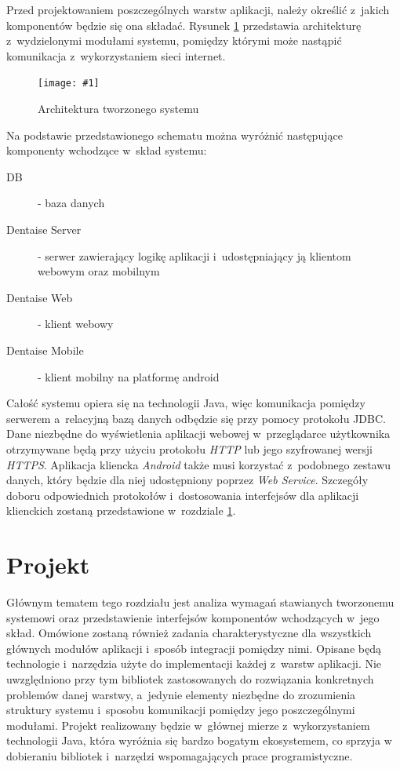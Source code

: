 \documentclass[11pt]{aghdpl}
\newcommand{\fullWidthPicture}[2]{
\begin{figure}[h!]
	\centering
		\texttt{[image: \#1]}
	\caption{#2}
	\label{fig:#1}
\end{figure}
}
\begin{document}

Przed projektowaniem poszczególnych warstw aplikacji, należy określić z~jakich komponentów będzie się ona składać. Rysunek \ref{fig:architektura} przedstawia architekturę z~wydzielonymi modułami systemu, pomiędzy którymi może nastąpić komunikacja z~wykorzystaniem sieci internet.

\fullWidthPicture{architektura}{Architektura tworzonego systemu}

Na podstawie przedstawionego schematu można wyróżnić następujące komponenty wchodzące w~skład systemu:
\begin{description}
\item[DB] - baza danych
\item[Dentaise Server] - serwer zawierający logikę aplikacji i~udostępniający ją klientom webowym oraz mobilnym
\item[Dentaise Web] - klient webowy
\item[Dentaise Mobile] - klient mobilny na platformę android
\end{description}

Całość systemu opiera się na technologii Java, więc komunikacja pomiędzy serwerem a~relacyjną bazą danych odbędzie się przy pomocy protokołu JDBC. Dane niezbędne do wyświetlenia aplikacji webowej w~przeglądarce użytkownika otrzymywane będą przy użyciu protokołu \emph{HTTP} lub jego szyfrowanej wersji \emph{HTTPS}. Aplikacja kliencka \emph{Android} także musi korzystać z~podobnego zestawu danych, który będzie dla niej udostępniony poprzez \emph{Web Service}. Szczegóły doboru odpowiednich protokołów i~dostosowania interfejsów dla aplikacji klienckich zostaną przedstawione w~rozdziale \ref{cha:dobor_technologii_i_narzedzi}. 


\chapter{Projekt}
\label{cha:dobor_technologii_i_narzedzi}

Głównym tematem tego rozdziału jest analiza wymagań stawianych tworzonemu systemowi oraz przedstawienie interfejsów komponentów wchodzących w~jego skład. Omówione zostaną również zadania charakterystyczne dla wszystkich głównych modułów aplikacji i~sposób integracji pomiędzy nimi. Opisane będą technologie i~narzędzia użyte do implementacji każdej z~warstw aplikacji. Nie uwzględniono przy tym bibliotek zastosowanych do rozwiązania konkretnych problemów danej warstwy, a~jedynie elementy niezbędne do zrozumienia struktury systemu i~sposobu komunikacji pomiędzy jego poszczególnymi modułami. Projekt realizowany będzie w~głównej mierze z~wykorzystaniem technologii Java, która wyróżnia się bardzo bogatym ekosystemem, co sprzyja w dobieraniu bibliotek i~narzędzi wspomagających prace programistyczne.
\end{document}
